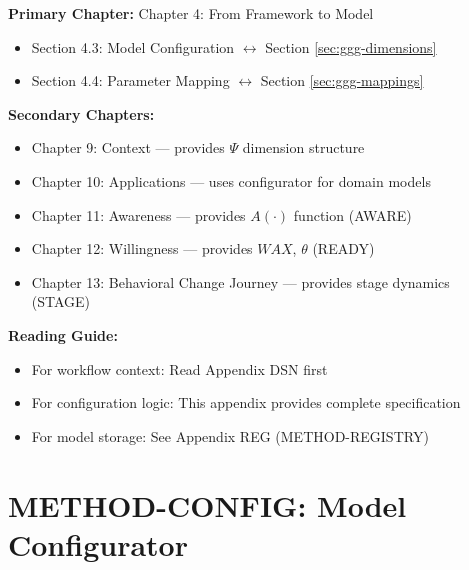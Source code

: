 \begin{tcolorbox}[colback=purple!5!white, colframe=purple!75!black,
    title=Chapter Linkage]

\textbf{Primary Chapter:} Chapter 4: From Framework to Model
\begin{itemize}[nosep]
\item Section 4.3: Model Configuration $\leftrightarrow$ Section \ref{sec:ggg-dimensions}
\item Section 4.4: Parameter Mapping $\leftrightarrow$ Section \ref{sec:ggg-mappings}
\end{itemize}

\textbf{Secondary Chapters:}
\begin{itemize}[nosep]
\item Chapter 9: Context --- provides $\Psi$ dimension structure
\item Chapter 10: Applications --- uses configurator for domain models
\item Chapter 11: Awareness --- provides $A(\cdot)$ function (AWARE)
\item Chapter 12: Willingness --- provides $WAX$, $\theta$ (READY)
\item Chapter 13: Behavioral Change Journey --- provides stage dynamics (STAGE)
\end{itemize}

\textbf{Reading Guide:}
\begin{itemize}[nosep]
\item For workflow context: Read Appendix DSN first
\item For configuration logic: This appendix provides complete specification
\item For model storage: See Appendix REG (METHOD-REGISTRY)
\end{itemize}

\end{tcolorbox}

\chapter{METHOD-CONFIG: Model Configurator}
\label{app:method-config}

\begin{abstract}
This appendix defines the Model Configurator---a systematic tool for generating
\textbf{10C-complete} behavioral models from four configuration dimensions: Level ($L$),
Geography ($\Psi_{geo}$), Domain, and Scope Type. The Configurator uses seven mapping
tables to auto-populate all 10C parameters: context ($\Psi$), utility dimensions ($C$),
complementarity ($\gamma$), functional form, awareness ($A$), willingness ($WAX$, $\theta$),
and stage dynamics ($\tau$, $\rho$, $\kappa$). This transforms model design from
an expert-dependent art into a structured, reproducible process with complete 10C coverage.
\end{abstract}


